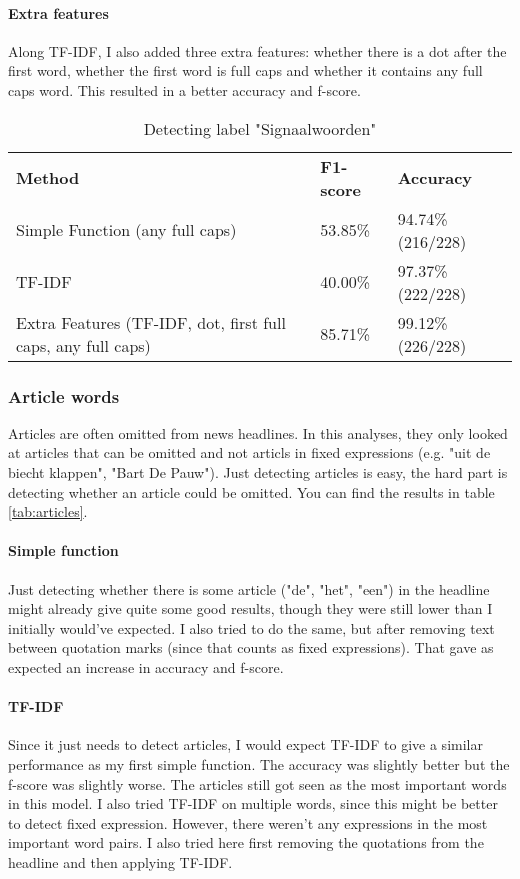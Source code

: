 \documentclass{article}
\begin{document}
\paragraph{Extra features} Along TF-IDF, I also added three extra features: whether there is a dot after the first word, whether the first word is full caps and whether it contains any full caps word. This resulted in a better accuracy and f-score.

\begin{table}[]
\begin{tabular}{lll}
\textbf{Method}                                              & \textbf{F1-score} & \textbf{Accuracy} \\
Simple Function (any full caps)                              & 53.85\%           & 94.74\% (216/228) \\
TF-IDF                                                       & 40.00\%           & 97.37\% (222/228) \\
Extra Features (TF-IDF, dot, first full caps, any full caps) & 85.71\%           & 99.12\% (226/228)
\end{tabular}
\caption{Detecting label "Signaalwoorden"}
\label{tab:signal}
\end{table}

\subsubsection{Article words}
Articles are often omitted from news headlines. In this analyses, they only looked at articles that can be omitted and not articls in fixed expressions (e.g. "uit de biecht klappen", "Bart De Pauw"). \cite{soubry} Just detecting articles is easy, the hard part is detecting whether an article could be omitted. You can find the results in table \ref{tab:articles}.

\paragraph{Simple function}
Just detecting whether there is some article ("de", "het", "een") in the headline might already give quite some good results, though they were still lower than I initially would've expected. I also tried to do the same, but after removing text between quotation marks (since that counts as fixed expressions). That gave as expected an increase in accuracy and f-score.

\paragraph{TF-IDF}
Since it just needs to detect articles, I would expect TF-IDF to give a similar performance as my first simple function. The accuracy was slightly better but the f-score was slightly worse. The articles still got seen as the most important words in this model. I also tried TF-IDF on multiple words, since this might be better to detect fixed expression. However, there weren't any expressions in the most important word pairs. I also tried here first removing the quotations from the headline and then applying TF-IDF.
\end{document}
